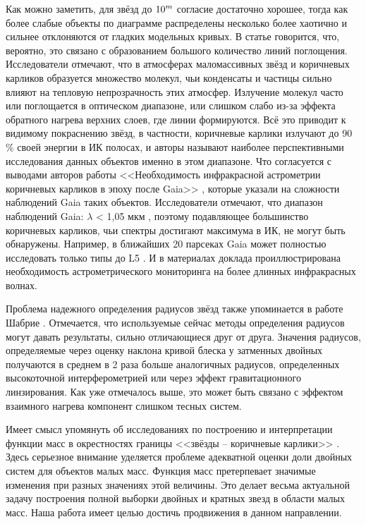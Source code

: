 Как можно заметить, для звёзд до \(\textup{10}^m\) согласие достаточно хорошее, тогда как более слабые объекты по диаграмме распределены несколько более хаотично и сильнее отклоняются от гладких модельных кривых. В статье говорится, что, вероятно, это связано с образованием большого количество линий поглощения. Исследователи отмечают, что в атмосферах маломассивных звёзд и коричневых карликов образуется множество молекул, чьи конденсаты и частицы сильно влияют на тепловую непрозрачность этих атмосфер. Излучение молекул часто или поглощается в оптическом диапазоне, или слишком слабо из-за эффекта обратного нагрева верхних слоев, где линии формируются. Всё это приводит к видимому покраснению звёзд, в частности, коричневые карлики излучают до 90\,\% своей энергии в ИК полосах, и авторы называют наиболее перспективными исследования данных объектов именно в этом диапазоне. Что согласуется с выводами авторов работы <<Необходимость инфракрасной астрометрии коричневых карликов в эпоху после Gaia>> \cite{2019BAAS...51c.105K}, которые указали на сложности наблюдений Gaia таких объектов. Исследователи отмечают, что диапазон наблюдений Gaia: $\lambda$ < 1,05 мкм \cite{2016A&A...595A...1G}, поэтому подавляющее большинство коричневых карликов, чьи спектры достигают максимума в ИК, не могут быть обнаружены. Например, в ближайших 20 парсеках Gaia может полностью исследовать только типы до L5 \cite{2019ApJS..240...19K}. И в материалах доклада проиллюстрирована необходимость астрометрического мониторинга на более длинных инфракрасных волнах.

Проблема надежного определения радиусов звёзд также упоминается в работе Шабрие \cite{2005astro.ph..9798C}. Отмечается, что используемые сейчас методы определения радиусов могут давать результаты, сильно отличающиеся друг от друга. Значения радиусов, определяемые через оценку наклона кривой блеска у затменных двойных получаются в среднем в 2 раза больше аналогичных радиусов, определенных высокоточной интерферометрией или через эффект гравитационного линзирования. Как уже отмечалось выше, это может быть связано с эффектом взаимного нагрева компонент слишком тесных систем.

Имеет смысл упомянуть об исследованиях по построению и интерпретации функции масс в окрестностях границы <<звёзды -- коричневые карлики>> \cite{2015ApJ...800...72T}. Здесь серьезное внимание уделяется проблеме адекватной оценки доли двойных систем для объектов малых масс. Функция масс претерпевает значимые изменения при разных значениях этой величины.  Это делает весьма актуальной задачу построения полной выборки двойных и кратных звезд в области малых масс. Наша работа имеет целью достичь продвижения в данном направлении.
\fi


